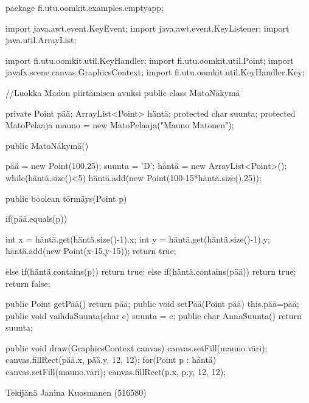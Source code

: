 \begin{javacode}
package fi.utu.oomkit.examples.emptyapp;

import java.awt.event.KeyEvent;
import java.awt.event.KeyListener;
import java.util.ArrayList;

import fi.utu.oomkit.util.KeyHandler;
import fi.utu.oomkit.util.Point;
import javafx.scene.canvas.GraphicsContext;
import fi.utu.oomkit.util.KeyHandler.Key;

//Luokka Madon piirtämisen avuksi
public class MatoNäkymä   {
	private Point pää;
	ArrayList<Point> häntä;
	protected char suunta;
	protected MatoPelaaja mauno = new MatoPelaaja("Mauno Matonen");
	
	public MatoNäkymä() {
		pää = new Point(100,25);
		suunta = 'D';
		häntä = new ArrayList<Point>();
		while(häntä.size()<5) {
			häntä.add(new Point(100-15*häntä.size(),25));}
		
	}
	public boolean törmäys(Point p) {
		if(pää.equals(p)) {

			int x = häntä.get(häntä.size()-1).x;
			int y = häntä.get(häntä.size()-1).y;
			häntä.add(new Point(x-15,y-15));
			return true;
		}else if(häntä.contains(p)) {return true;}
		else if(häntä.contains(pää)) {return true;}
		return false;
		}
	public Point getPää() {
		return pää;
	}
	public void setPää(Point pää) {
		this.pää=pää;
	}
	public void vaihdaSuunta(char c) {
		suunta = c;
	}
	public char AnnaSuunta() {
		return suunta;
	}
	
	public void draw(GraphicsContext canvas) {
		canvas.setFill(mauno.väri);
        canvas.fillRect(pää.x, pää.y, 12, 12);
        for(Point p : häntä) {
        	canvas.setFill(mauno.väri);
            canvas.fillRect(p.x, p.y, 12, 12);
        }
	}
	 
		
    
}


\end{javacode}







Tekijänä Janina Kuosmanen (516580)
